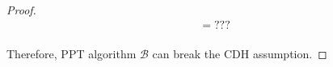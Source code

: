 \documentclass[times]{secauth}
\theoremstyle{definition}
\theoremstyle{remark}
\begin{document}
\begin{proof}
\begin{align*}
&= ???
\end{align*}
\vspace{0.2cm}
\\
Therefore, PPT algorithm $\mathcal{B}$ can break the CDH assumption.
\end{proof}
\end{document}
